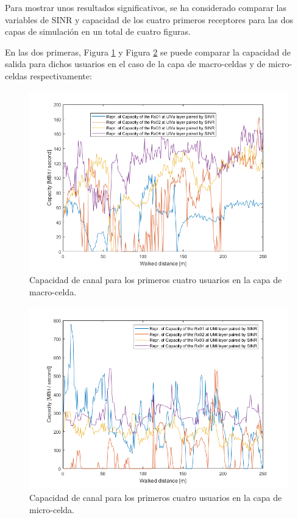 Para mostrar unos resultados significativos, se ha considerado comparar las variables de SINR y capacidad de los cuatro primeros receptores para las dos capas de simulación en un total de cuatro figuras.

En las dos primeras, Figura \ref{fig:simulacion_completa_cap_uma} y Figura \ref{fig:simulacion_completa_cap_umi} se puede comparar la capacidad de salida para dichos usuarios en el caso de la capa de macro-celdas y de micro-celdas respectivamente:

\begin{figure}[h!]
	\centering
    \includegraphics[width=0.8\linewidth]{imagenes/6_2_capacidad_uma.png}
	\caption{Capacidad de canal para los primeros cuatro usuarios en la capa de macro-celda.}
	\label{fig:simulacion_completa_cap_uma}
\end{figure}

\begin{figure}[h!]
	\centering
    \includegraphics[width=0.8\linewidth]{imagenes/6_2_capacidad_umi.png}
	\caption{Capacidad de canal para los primeros cuatro usuarios en la capa de micro-celda.}
	\label{fig:simulacion_completa_cap_umi}
\end{figure}

